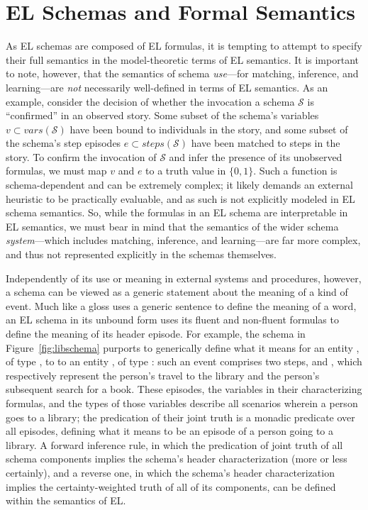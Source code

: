 \section{EL Schemas and Formal Semantics}
\label{sec:formal_semantics}


As EL schemas are composed of EL formulas, it is tempting to attempt to specify their full semantics in the model-theoretic terms of EL semantics. It is important to note, however, that the semantics of schema \textit{use}---for matching, inference, and learning---are \textit{not} necessarily well-defined in terms of EL semantics. As an example, consider the decision of whether the invocation a schema $\mathcal{S}$ is ``confirmed'' in an observed story. Some subset of the schema's variables $v \subset vars(\mathcal{S})$ have been bound to individuals in the story, and some subset of the schema's step episodes $e \subset steps(\mathcal{S})$ have been matched to steps in the story. To confirm the invocation of $\mathcal{S}$ and infer the presence of its unobserved formulas, we must map $v$ and $e$ to a truth value in $\{0, 1\}$. Such a function is schema-dependent and can be extremely complex; it likely demands an external heuristic to be practically evaluable, and as such is not explicitly modeled in EL schema semantics. So, while the formulas in an EL schema are interpretable in EL semantics, we must bear in mind that the semantics of the wider schema \textit{system}---which includes matching, inference, and learning---are far more complex, and thus not represented explicitly in the schemas themselves.

Independently of its use or meaning in external systems and procedures, however, a schema can be viewed as a generic statement about the meaning of a kind of event. Much like a gloss uses a generic sentence to define the meaning of a word, an EL schema in its unbound form uses its fluent and non-fluent formulas to define the meaning of its header episode. For example, the schema in Figure~\ref{fig:libschema} purports to generically define what it means for an entity , of type , to  to an entity , of type : such an event comprises two steps,  and , which respectively represent the person's travel to the library and the person's subsequent search for a book. These episodes, the variables in their characterizing formulas, and the types of those variables describe all scenarios  wherein a person goes to a library; the predication of their joint truth is a monadic predicate over all episodes, defining what it means to be an episode of a person going to a library. A forward inference rule, in which the predication of joint truth of all schema components implies the schema's header characterization (more or less certainly), and a reverse one, in which the schema's header characterization implies the certainty-weighted truth of all of its components, can be defined within the semantics of EL.

